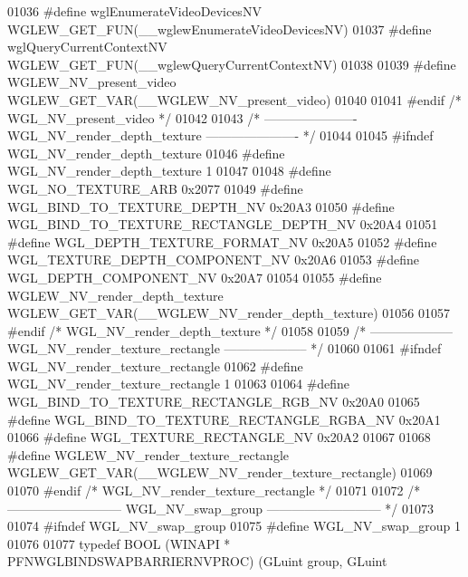 \begin{DoxyCode}
01036 \textcolor{preprocessor}{#define wglEnumerateVideoDevicesNV WGLEW\_GET\_FUN(\_\_wglewEnumerateVideoDevicesNV)}
01037 \textcolor{preprocessor}{#define wglQueryCurrentContextNV WGLEW\_GET\_FUN(\_\_wglewQueryCurrentContextNV)}
01038 
01039 \textcolor{preprocessor}{#define WGLEW\_NV\_present\_video WGLEW\_GET\_VAR(\_\_WGLEW\_NV\_present\_video)}
01040 
01041 \textcolor{preprocessor}{#endif }\textcolor{comment}{/* WGL\_NV\_present\_video */}\textcolor{preprocessor}{}
01042 
01043 \textcolor{comment}{/* ---------------------- WGL\_NV\_render\_depth\_texture ---------------------- */}
01044 
01045 \textcolor{preprocessor}{#ifndef WGL\_NV\_render\_depth\_texture}
01046 \textcolor{preprocessor}{#define WGL\_NV\_render\_depth\_texture 1}
01047 
01048 \textcolor{preprocessor}{#define WGL\_NO\_TEXTURE\_ARB 0x2077}
01049 \textcolor{preprocessor}{#define WGL\_BIND\_TO\_TEXTURE\_DEPTH\_NV 0x20A3}
01050 \textcolor{preprocessor}{#define WGL\_BIND\_TO\_TEXTURE\_RECTANGLE\_DEPTH\_NV 0x20A4}
01051 \textcolor{preprocessor}{#define WGL\_DEPTH\_TEXTURE\_FORMAT\_NV 0x20A5}
01052 \textcolor{preprocessor}{#define WGL\_TEXTURE\_DEPTH\_COMPONENT\_NV 0x20A6}
01053 \textcolor{preprocessor}{#define WGL\_DEPTH\_COMPONENT\_NV 0x20A7}
01054 
01055 \textcolor{preprocessor}{#define WGLEW\_NV\_render\_depth\_texture WGLEW\_GET\_VAR(\_\_WGLEW\_NV\_render\_depth\_texture)}
01056 
01057 \textcolor{preprocessor}{#endif }\textcolor{comment}{/* WGL\_NV\_render\_depth\_texture */}\textcolor{preprocessor}{}
01058 
01059 \textcolor{comment}{/* -------------------- WGL\_NV\_render\_texture\_rectangle -------------------- */}
01060 
01061 \textcolor{preprocessor}{#ifndef WGL\_NV\_render\_texture\_rectangle}
01062 \textcolor{preprocessor}{#define WGL\_NV\_render\_texture\_rectangle 1}
01063 
01064 \textcolor{preprocessor}{#define WGL\_BIND\_TO\_TEXTURE\_RECTANGLE\_RGB\_NV 0x20A0}
01065 \textcolor{preprocessor}{#define WGL\_BIND\_TO\_TEXTURE\_RECTANGLE\_RGBA\_NV 0x20A1}
01066 \textcolor{preprocessor}{#define WGL\_TEXTURE\_RECTANGLE\_NV 0x20A2}
01067 
01068 \textcolor{preprocessor}{#define WGLEW\_NV\_render\_texture\_rectangle WGLEW\_GET\_VAR(\_\_WGLEW\_NV\_render\_texture\_rectangle)}
01069 
01070 \textcolor{preprocessor}{#endif }\textcolor{comment}{/* WGL\_NV\_render\_texture\_rectangle */}\textcolor{preprocessor}{}
01071 
01072 \textcolor{comment}{/* --------------------------- WGL\_NV\_swap\_group --------------------------- */}
01073 
01074 \textcolor{preprocessor}{#ifndef WGL\_NV\_swap\_group}
01075 \textcolor{preprocessor}{#define WGL\_NV\_swap\_group 1}
01076 
01077 \textcolor{keyword}{typedef} BOOL (WINAPI * PFNWGLBINDSWAPBARRIERNVPROC) (GLuint group, GLuint 

\end{DoxyCode}
